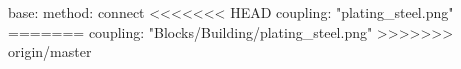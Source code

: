 base:
  method: connect
<<<<<<< HEAD
  coupling: "plating_steel.png"
=======
  coupling: "Blocks/Building/plating_steel.png"
>>>>>>> origin/master
